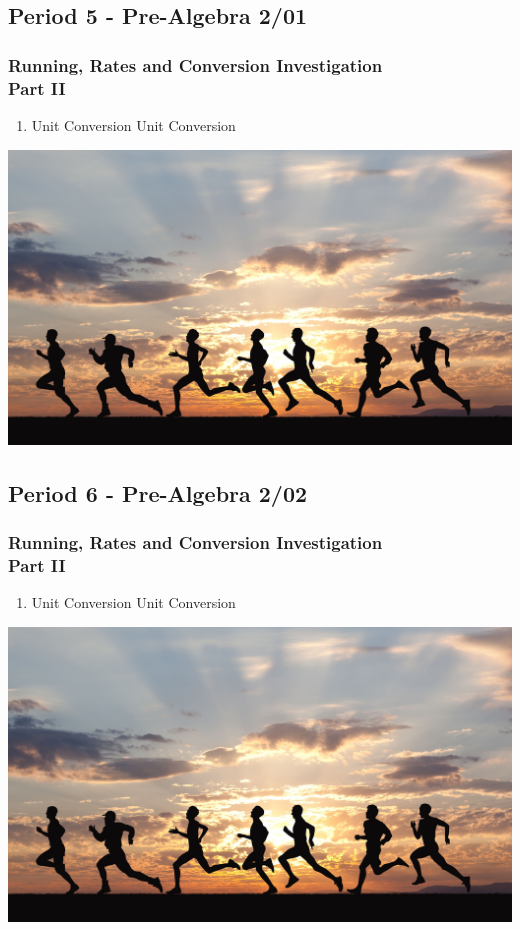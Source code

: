  \subsection[PA2/01]{Period 5 - Pre-Algebra 2/01}
   \begin{frame}[label=PA2_01]
 	\frametitle{Running, Rates and Conversion Investigation \\ Part II}

        \begin{enumerate}
   	   	   \item Unit Conversion  
   	   	   \rightarrowitem Unit Conversion  
   	     \end{enumerate}
   	\vspace{-12pt}
   	\begin{center}
   		\includegraphics[width=0.7\linewidth]{Images/running}
   	\end{center}
   	\vspace{-20pt}
 	\end{frame}

  \subsection[PA2/02]{Period 6 - Pre-Algebra 2/02}
  \begin{frame}[label=PA2_02]
  	\frametitle{Running, Rates and Conversion Investigation \\ Part II}

       \begin{enumerate}
   	   	    \item Unit Conversion  
   	   	    \rightarrowitem Unit Conversion  
   	     \end{enumerate}
   	  	\vspace{-12pt}
   	  	\begin{center}
   	  		\includegraphics[width=0.7\linewidth]{Images/running}
   	  	\end{center}
   	  	\vspace{-20pt}

    \end{frame}

